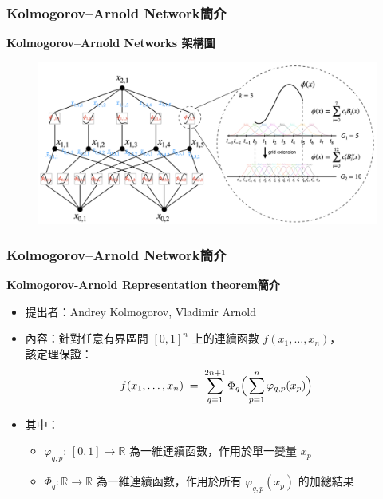 \documentclass{beamer}
\begin{document}
\begin{frame}
    \frametitle{Kolmogorov–Arnold Network簡介}
    \centering
    \textbf{Kolmogorov–Arnold Networks 架構圖}\\
    \begin{figure}               %
    \centering                 %
    \includegraphics[width=\textwidth,keepaspectratio]{figures/KAN架構.png}
    \end{figure}
\end{frame}

\begin{frame}
    \frametitle{Kolmogorov–Arnold Network簡介}
    \centering
    \textbf{Kolmogorov-Arnold Representation theorem簡介}\\[0.5cm]
    \begin{itemize}
    \item 提出者：Andrey Kolmogorov, Vladimir Arnold
    \item 內容：針對任意有界區間 $[0,1]^n$ 上的連續函數 $f(x_1,\dots,x_n)$，\\\hspace*{3em}該定理保證：
      \begin{equation*}\label{eq:kat}
        f(x_1,\dots,x_n)
        \;=\;
        \sum_{q=1}^{2n+1}
        \Phi_q\Bigl(\,\sum_{p=1}^n \varphi_{q,p}(x_p)\Bigr)
      \end{equation*}
    \item 其中：
      \begin{itemize}
        \item $\varphi_{q,p}:\,[0,1]\to\mathbb{R}$ 為一維連續函數，作用於單一變量 $x_p$
        \item $\Phi_q:\mathbb{R}\to\mathbb{R}$ 為一維連續函數，作用於所有 $\varphi_{q,p}(x_p)$ 的加總結果
      \end{itemize}
  \end{itemize}
\end{frame}
\end{document}

